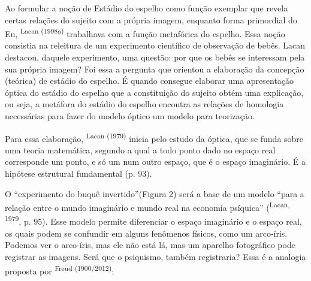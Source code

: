 \begin{multicols}{2}
\par{}Ao formular a noção de Estádio do espelho como função exemplar que revela certas relações do sujeito com a própria imagem,\allowbreak{} enquanto forma primordial do Eu,\allowbreak{} \textsuperscript{Lacan (\allowbreak{}1998a)\allowbreak{}} trabalhava com a função metafórica do espelho.\allowbreak{} Essa noção consistia na releitura de um experimento científico de observação de bebês.\allowbreak{} Lacan destacou,\allowbreak{} daquele experimento,\allowbreak{} uma questão:\allowbreak{} por que os bebês se interessam pela sua própria imagem? Foi essa a pergunta que orientou a elaboração da concepção (\allowbreak{}teórica)\allowbreak{} de estádio do espelho.\allowbreak{} É quando consegue elaborar uma apresentação óptica do estádio do espelho que a constituição do sujeito obtém uma explicação,\allowbreak{} ou seja,\allowbreak{} a metáfora do estádio do espelho encontra as relações de homologia necessárias para fazer do modelo óptico um modelo para teorização.\allowbreak{}\par{}Para essa elaboração,\allowbreak{} \textsuperscript{Lacan (\allowbreak{}1979)\allowbreak{}} inicia pelo estudo da óptica,\allowbreak{} que se funda sobre uma teoria matemática,\allowbreak{} segundo a qual a todo ponto dado no espaço real corresponde um ponto,\allowbreak{} e só um num outro espaço,\allowbreak{} que é o espaço imaginário.\allowbreak{} É a hipótese estrutural fundamental (\allowbreak{}p.\allowbreak{} 93)\allowbreak{}.\allowbreak{}\par{}O “experimento do buquê invertido”(\allowbreak{}Figura 2)\allowbreak{} será a base de um modelo “para a relação entre o mundo imaginário e mundo real na economia psíquica” (\allowbreak{}\textsuperscript{Lacan,\allowbreak{} 1979},\allowbreak{} p.\allowbreak{} 95)\allowbreak{}.\allowbreak{} Esse modelo permite diferenciar o espaço imaginário e o espaço real,\allowbreak{} os quais podem se confundir em alguns fenômenos físicos,\allowbreak{} como um arco-\allowbreak{}íris.\allowbreak{} Podemos ver o arco-\allowbreak{}íris,\allowbreak{} mas ele não está lá,\allowbreak{} mas um aparelho fotográfico pode registrar as imagens.\allowbreak{} Será que o psiquismo,\allowbreak{} também registraria? Essa é a analogia proposta por \textsuperscript{Freud (\allowbreak{}1900\fshyp{}2012)\allowbreak{}}:\allowbreak{}\par{}
\par

\end{multicols}
